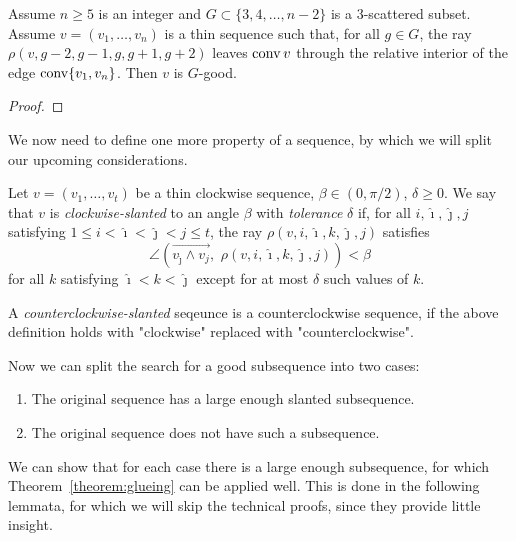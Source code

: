 \begin{lemma}\label{lemma:ray-good}
  Assume $n\geq 5$ is an integer and $G\subset\{3,4,\dots,n-2\}$ is a $3$-scattered subset. Assume $v=(v_1,\dots,v_n)$ is a thin sequence such that, for all $g\in G$, the ray $\rho(v, g-2,g-1,g,g+1,g+2)$ leaves $\operatorname{conv} v$ through the relative interior of the edge $\operatorname{conv}\{v_1, v_n\}$. Then $v$ is $G$-good.
\end{lemma}

\begin{proof}
\end{proof}

We now need to define one more property of a sequence, by which we will split our upcoming considerations.

\begin{definition}
  Let $v=(v_1,\ldots,v_t)$ be a thin clockwise sequence, ${\beta\in(0,\pi/2)}$, $\delta\geqslant 0$. We say that $v$ is \textit{clockwise-slanted} to an angle $\beta$ with \textit{tolerance} $\delta$ if, for all $i,\hat{\imath},\hat{\jmath}, j$ satisfying $1\leqslant i<\hat{\imath}<\hat{\jmath}<j\leqslant t$, the ray ${\rho}(v,i,\hat{\imath},k,\hat{\jmath}, j)$ satisfies $$\angle\left(\overrightarrow{v_{\hat{\jmath}}\wedge v_j},\,\,\rho(v,i,\hat{\imath},k,\hat{\jmath}, j)\right)<\beta$$ for all $k$ satisfying $\hat{\imath}<k<\hat{\jmath}$ except for at most $\delta$ such values of $k$. 

  A \textit{counterclockwise-slanted} seqeunce is a counterclockwise sequence, if the above definition holds with "clockwise" replaced with "counterclockwise".
\end{definition}

Now we can split the search for a good subsequence into two cases:
\begin{enumerate}
  \item The original sequence has a large enough slanted subsequence.
  \item The original sequence does not have such a subsequence.
\end{enumerate}

We can show that for each case there is a large enough subsequence, for which Theorem~\ref{theorem:glueing} can be applied well. This is done in the following lemmata, for which we will skip the technical proofs, since they provide little insight.


